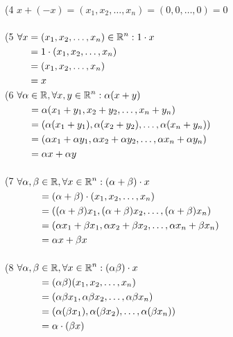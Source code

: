\begin{example}
\setLR
	\noindent
	(4 $x + (-x) = (x_1, x_2, \dots, x_n)= (0, 0, \dots, 0) = 0$ \\ 
	\\
	(5 $
	\begin{aligned}[t]
			\forall x &= (x_1, x_2, \dots, x_n) \in \mathbb{R}^n: 1\cdot x\\
			&= 1 \cdot (x_1, x_2, \dots, x_n)\\
			&= (x_1, x_2, \dots, x_n) \\
			&= x
	\end{aligned}
$\\
\noindent
(6 $
\begin{aligned}[t]
	\forall \alpha&\in\mathbb{R} , \forall x,y \in \mathbb{R}^n: \alpha (x+y)\\
	&= \alpha(x_1+y_1, x_2+y_2, \dots, x_n+y_n)\\
	&= (\alpha(x_1+y_1), \alpha(x_2+y_2), \dots, \alpha(x_n+y_n))\\
	&= (\alpha x_1+\alpha y_1, \alpha x_2+\alpha y_2, \dots, \alpha x_n+\alpha y_n)\\
	&= \alpha x + \alpha y
\end{aligned}
$\\\\
\noindent
(7 $
\begin{aligned}[t]
	\forall \alpha, \beta &\in \mathbb{R}, \forall x\in \mathbb{R}^n: (\alpha + \beta)\cdot x\\
	&= (\alpha + \beta)\cdot (x_1, x_2, \dots, x_n)\\
	&= ((\alpha+\beta)x_1, (\alpha+\beta)x_2, \dots, (\alpha+\beta)x_n)\\
	&= (\alpha x_1 + \beta x_1, \alpha x_2 + \beta x_2, \dots , \alpha x_n + \beta x_n)\\
	&= \alpha x + \beta x
\end{aligned}
$\\
\\
(8 $
\begin{aligned}[t]
		\forall \alpha, \beta &\in \mathbb{R}, \forall x\in \mathbb{R}^n: (\alpha \beta)\cdot x\\
		&= (\alpha\beta)(x_1, x_2, \dots, x_n)\\
		&= (\alpha\beta x_1, \alpha\beta x_2, \dots, \alpha\beta x_n)\\
		&= (\alpha(\beta x_1), \alpha(\beta x_2), \dots, \alpha(\beta x_n))\\
		&= \alpha \cdot (\beta x)
\end{aligned}
$
\end{example}

